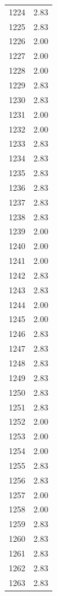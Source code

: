 \documentclass[a4paper,11pt]{article}
\begin{document}
\begin{center}
\begin{longtable}{|R{1.5cm}|R{2.5cm}|}
 1224  &         2.83 \\ 
 1225  &         2.83 \\ 
 1226  &         2.00 \\ 
 1227  &         2.00 \\ 
 1228  &         2.00 \\ 
 1229  &         2.83 \\ 
 1230  &         2.83 \\ 
 1231  &         2.00 \\ 
 1232  &         2.00 \\ 
 1233  &         2.83 \\ 
 1234  &         2.83 \\ 
 1235  &         2.83 \\ 
 1236  &         2.83 \\ 
 1237  &         2.83 \\ 
 1238  &         2.83 \\ 
 1239  &         2.00 \\ 
 1240  &         2.00 \\ 
 1241  &         2.00 \\ 
 1242  &         2.83 \\ 
 1243  &         2.83 \\ 
 1244  &         2.00 \\ 
 1245  &         2.00 \\ 
 1246  &         2.83 \\ 
 1247  &         2.83 \\ 
 1248  &         2.83 \\ 
 1249  &         2.83 \\ 
 1250  &         2.83 \\ 
 1251  &         2.83 \\ 
 1252  &         2.00 \\ 
 1253  &         2.00 \\ 
 1254  &         2.00 \\ 
 1255  &         2.83 \\ 
 1256  &         2.83 \\ 
 1257  &         2.00 \\ 
 1258  &         2.00 \\ 
 1259  &         2.83 \\ 
 1260  &         2.83 \\ 
 1261  &         2.83 \\ 
 1262  &         2.83 \\ 
 1263  &         2.83 \\ 

\end{longtable}
\end{center}
\end{document}

